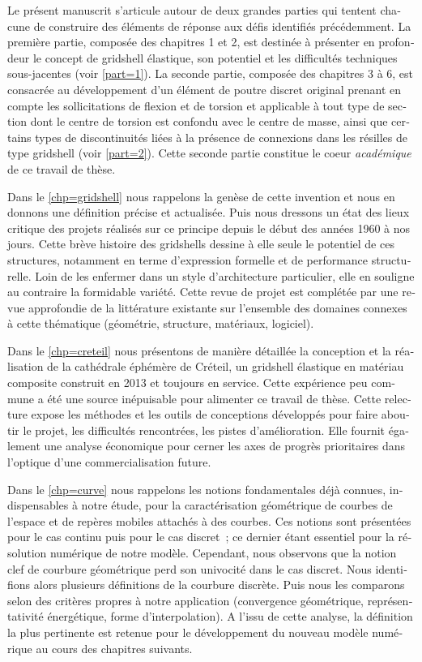 \begin{otherlanguage}{french}
Le présent manuscrit s'articule autour de deux grandes parties qui tentent chacune de construire des éléments de réponse aux défis identifiés précédemment. La première partie, composée des chapitres 1 et 2, est destinée à présenter en profondeur le concept de gridshell élastique, son potentiel et les difficultés techniques sous-jacentes (voir \cref{part=1}). La seconde partie, composée des chapitres 3 à 6, est consacrée au développement d'un élément de poutre discret original prenant en compte les sollicitations de flexion et de torsion et applicable à tout type de section dont le centre de torsion est confondu avec le centre de masse, ainsi que certains types de discontinuités liées à la présence de connexions dans les résilles de type gridshell (voir \cref{part=2}). Cette seconde partie constitue le coeur \emph{académique} de ce travail de thèse.

Dans le \cref{chp=gridshell} nous rappelons la genèse de cette invention et nous en donnons une définition précise et actualisée. Puis nous dressons un état des lieux critique des projets réalisés sur ce principe depuis le début des années 1960 à nos jours. Cette brève histoire des gridshells dessine à elle seule le potentiel de ces structures, notamment en terme d'expression formelle et de performance structurelle. Loin de les enfermer dans un style d'architecture particulier, elle en souligne au contraire la formidable variété. Cette revue de projet est complétée par une revue approfondie de la littérature existante sur l'ensemble des domaines connexes à cette thématique (géométrie, structure, matériaux, logiciel).

Dans le \cref{chp=creteil} nous présentons de manière détaillée la conception et la réalisation de la cathédrale éphémère de Créteil, un gridshell élastique en matériau composite construit en 2013 et toujours en service. Cette expérience peu commune a été une source inépuisable pour alimenter ce travail de thèse. Cette relecture expose les méthodes et les outils de conceptions développés pour faire aboutir le projet, les difficultés rencontrées, les pistes d'amélioration. Elle fournit également une analyse économique pour cerner les axes de progrès prioritaires dans l'optique d'une commercialisation future.

Dans le \cref{chp=curve} nous rappelons les notions fondamentales déjà connues, indispensables à notre étude, pour la caractérisation géométrique de courbes de l'espace et de repères mobiles attachés à des courbes. Ces notions sont présentées pour le cas continu puis pour le cas discret~; ce dernier étant essentiel pour la résolution numérique de notre modèle. Cependant, nous observons que la notion clef de courbure géométrique perd son univocité dans le cas discret. Nous identifions alors plusieurs définitions de la courbure discrète. Puis nous les comparons selon des critères propres à notre application (convergence géométrique, représentativité énergétique, forme d'interpolation). A l'issu de cette analyse, la définition la plus pertinente est retenue pour le développement du nouveau modèle numérique au cours des chapitres suivants.


\end{otherlanguage}
